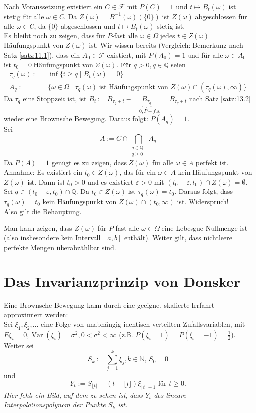 \documentclass[a4paper,twoside,DIV15,BCOR12mm]{scrbook}
\begin{document}
\begin{beweis}
  Nach Voraussetzung existiert ein $C\in\mathcal F$ mit $P(C)=1$ und $t\mapsto B_t(\omega)$ ist stetig für alle $\omega\in C$. Da $Z(\omega)=B^{-1}(\omega)(\{0\})$ ist $Z(\omega)$ abgeschlossen für alle $\omega\in C$, da $\{0\}$ abgeschlossen und $t\mapsto B_t(\omega)$ stetig ist. \\
Es bleibt noch zu zeigen, dass für $P$-fast alle $\omega\in\Omega$ jedes $t\in Z(\omega)$ Häufungspunkt von $Z(\omega)$ ist. Wir wissen bereits (Vergleich: Bemerkung nach Satz \ref{satz:11.1}), dass ein $A_0\in\mathcal F$ existiert, mit $P(A_0)=1$ und für alle $\omega\in A_0$ ist $t_0=0$ Häufungspunkt von $Z(\omega)$.
Für $q>0,q\in\mathbb Q$ seien
\begin{align*}
  \tau_q(\omega):=&\inf\{t\geq q\mid B_t(\omega)=0\} \\
A_q:=&\{\omega\in\Omega\mid\tau_q(\omega)\text{ ist Häufungspunkt von $Z(\omega)\cap(\tau_q(\omega),\infty)$}\}
\end{align*}
Da $\tau_q$ eine Stoppzeit ist, ist $\tilde B_t:=B_{\tau_q+t}-\underbrace{B_{\tau_q}}_{=0, P-f.s.}=B_{\tau_q+t}$ nach Satz \ref{satz:13.2} wieder eine Brownsche Bewegung. Daraus folgt: $P(A_q)=1$.\\
Sei
\[
A:=C\cap\bigcap_{\begin{array}{c}q\in\mathbb Q,\\q\geq0\end{array}}A_q
\]
Da $P(A)=1$ genügt es zu zeigen, dass $Z(\omega)$ für alle $\omega\in A$ perfekt ist. \\
Annahme: Es existiert ein $t_0\in Z(\omega)$, das für ein $\omega\in A$ kein Häufungspunkt von $Z(\omega)$ ist. Dann ist $t_0>0$ und es existiert $\varepsilon>0$ mit $(t_0-\varepsilon,t_0)\cap Z(\omega)=\emptyset$. Sei $q\in(t_0-\varepsilon,t_0)\cap\mathbb Q$. Da $t_0\in Z(\omega)$ ist $\tau_q(\omega)=t_0$. Daraus folgt, dass $\tau_q(\omega)=t_0$ kein Häufungspunkt von $Z(\omega)\cap(t_0,\infty)$ ist. Widerspruch! \\
Also gilt die Behauptung.
\end{beweis}
\begin{bemerkung}
  Man kann zeigen, dass $Z(\omega)$ für $P$-fast alle $\omega\in\Omega$ eine Lebesgue-Nullmenge ist  (also insbesondere kein Intervall $[a,b]$ enthält). Weiter gilt, dass nichtleere perfekte Mengen überabzählbar sind.
\end{bemerkung}

\section{Das Invarianzprinzip von Donsker}
Eine Brownsche Bewegung kann durch eine geeignet skalierte Irrfahrt approximiert werden: \\
Sei $\xi_1,\xi_2,\dots$ eine Folge von unabhängig identisch verteilten Zufallsvariablen, mit $E\xi_i=0, \operatorname{Var}(\xi_i)=\sigma^2,0<\sigma^2<\infty$ (z.B. $P(\xi_i=1)=P(\xi_i=-1)=\frac{1}{2}$). Weiter sei
\[
S_k:=\sum_{j=1}^k\xi_j,k\in\mathbb N,\,S_0=0
\]
und
\[
Y_t:=S_{\lfloor t\rfloor}+(t-\lfloor t\rfloor)\xi_{\lfloor t\rfloor+1}\text{ für }t\geq0.
\]
\emph{Hier fehlt ein Bild, auf dem zu sehen ist, dass $Y_t$ das lineare Interpolationspolynom der Punkte $S_k$ ist.}
\end{document}
